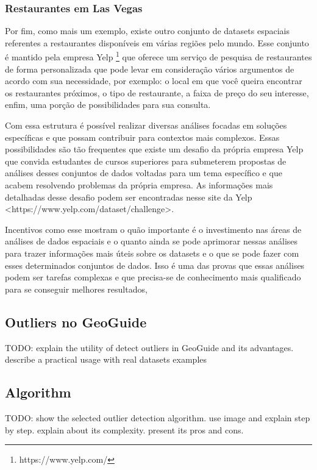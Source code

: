 \subsubsection{Restaurantes em Las Vegas}

Por fim, como mais um exemplo, existe outro conjunto de datasets espaciais referentes a restaurantes disponíveis em várias regiões pelo mundo. Esse conjunto é mantido pela empresa Yelp \footnote{https://www.yelp.com/} que oferece um serviço de pesquisa de restaurantes de forma personalizada que pode levar em consideração vários argumentos de acordo com sua necessidade, por exemplo: o local em que você queira encontrar os restaurantes próximos, o tipo de restaurante, a faixa de preço do seu interesse, enfim, uma porção de possibilidades para sua consulta.

Com essa estrutura é possível realizar diversas análises focadas em soluções específicas e que possam contribuir para contextos mais complexos. Essas possibilidades são tão frequentes que existe um desafio da própria empresa Yelp que convida estudantes de cursos superiores para submeterem propostas de análises desses conjuntos de dados voltadas para um tema específico e que acabem resolvendo problemas da própria empresa. As informações mais detalhadas desse desafio podem ser encontradas nesse site da Yelp <https://www.yelp.com/dataset/challenge>.

Incentivos como esse mostram o quão importante é o investimento nas áreas de análises de dados espaciais e o quanto ainda se pode aprimorar nessas análises para trazer informações mais úteis sobre os datasets e o que se pode fazer com esses determinados conjuntos de dados. Isso é uma das provas que essas análises podem ser tarefas complexas e que precisa-se de conhecimento mais qualificado para se conseguir melhores resultados,

\subsection{Outliers no GeoGuide}

TODO: explain the utility of detect outliers in GeoGuide and its advantages. describe a practical usage with real datasets examples

\subsection{Algorithm}

TODO: show the selected outlier detection algorithm. use image and explain step by step. explain about its complexity. present its pros and cons.

